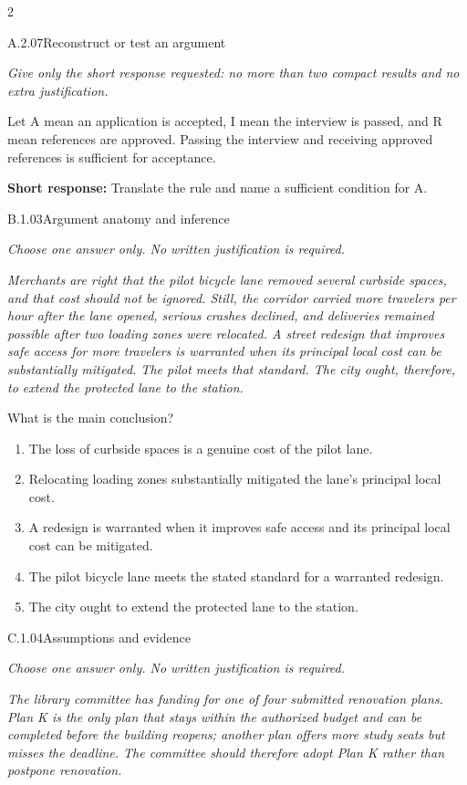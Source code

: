 \documentclass[9pt]{extarticle}
\newcommand{\choice}[1]{\item #1}
\begin{document}
\begin{multicols}{2}
\begin{DenseCoreProblem}{A.2.07}{Reconstruct or test an argument}
{\scriptsize\textit{Give only the short response requested: no more than two compact results and no extra justification.}\par}
Let A mean an application is accepted, I mean the interview is passed, and R mean references are approved. Passing the interview and receiving approved references is sufficient for acceptance.

\textbf{Short response:} Translate the rule and name a sufficient condition for A.
\end{DenseCoreProblem}
\begin{DenseCoreProblem}{B.1.03}{Argument anatomy and inference}
{\scriptsize\textit{Choose one answer only. No written justification is required.}\par}
\emph{Merchants are right that the pilot bicycle lane removed several curbside spaces, and that cost should not be ignored. Still, the corridor carried more travelers per hour after the lane opened, serious crashes declined, and deliveries remained possible after two loading zones were relocated. A street redesign that improves safe access for more travelers is warranted when its principal local cost can be substantially mitigated. The pilot meets that standard. The city ought, therefore, to extend the protected lane to the station.}

What is the main conclusion?
\begin{enumerate}[label=(\alph*)]
  \choice{The loss of curbside spaces is a genuine cost of the pilot lane.}
  \choice{Relocating loading zones substantially mitigated the lane's principal local cost.}
  \choice{A redesign is warranted when it improves safe access and its principal local cost can be mitigated.}
  \choice{The pilot bicycle lane meets the stated standard for a warranted redesign.}
  \choice{The city ought to extend the protected lane to the station.}
\end{enumerate}
\end{DenseCoreProblem}
\columnbreak
\begin{DenseCoreProblem}{C.1.04}{Assumptions and evidence}
{\scriptsize\textit{Choose one answer only. No written justification is required.}\par}
\emph{The library committee has funding for one of four submitted renovation plans. Plan K is the only plan that stays within the authorized budget and can be completed before the building reopens; another plan offers more study seats but misses the deadline. The committee should therefore adopt Plan K rather than postpone renovation.}


\end{DenseCoreProblem}
\end{multicols}
\end{document}
